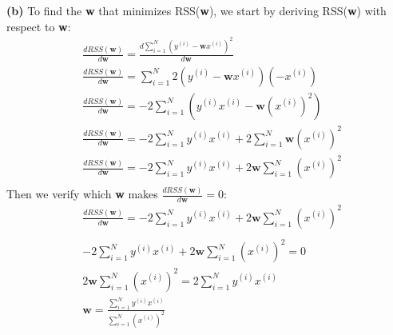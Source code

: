 \documentclass[leqno]{article}
\begin{document}
\hfill

\noindent \textbf{(b)} To find the \textbf{w} that minimizes RSS(\textbf{w}), we start by deriving RSS(\textbf{w}) with respect to \textbf{w}:
\begin{equation*}
\begin{split}
&\frac{dRSS(\textbf{w})}{d\textbf{w}} = \frac{d\sum_{i=1}^{N}(y^{(i)} - \textbf{w}x^{(i)})^2}{d\textbf{w}}\\
&\frac{dRSS(\textbf{w})}{d\textbf{w}} = \sum_{i=1}^{N}2(y^{(i)} - \textbf{w}x^{(i)})(-x^{(i)})\\
&\frac{dRSS(\textbf{w})}{d\textbf{w}} = -2\sum_{i=1}^{N}(y^{(i)}x^{(i)} - \textbf{w}(x^{(i)})^2)\\
&\frac{dRSS(\textbf{w})}{d\textbf{w}} = -2\sum_{i=1}^{N}y^{(i)}x^{(i)} + 2\sum_{i=1}^{N}\textbf{w}(x^{(i)})^2\\
&\frac{dRSS(\textbf{w})}{d\textbf{w}} = -2\sum_{i=1}^{N}y^{(i)}x^{(i)} + 2\textbf{w}\sum_{i=1}^{N}(x^{(i)})^2\\  
\end{split}
\end{equation*}   
Then we verify which \textbf{w} makes $\frac{dRSS(\textbf{w})}{d\textbf{w}} = 0$:
\begin{equation*}
\begin{split}
&\frac{dRSS(\textbf{w})}{d\textbf{w}} = -2\sum_{i=1}^{N}y^{(i)}x^{(i)} + 2\textbf{w}\sum_{i=1}^{N}(x^{(i)})^2\\\\
&-2\sum_{i=1}^{N}y^{(i)}x^{(i)} + 2\textbf{w}\sum_{i=1}^{N}(x^{(i)})^2 = 0\\
&2\textbf{w}\sum_{i=1}^{N}(x^{(i)})^2 = 2\sum_{i=1}^{N}y^{(i)}x^{(i)}\\
&\textbf{w} = \frac{\sum_{i=1}^{N}y^{(i)}x^{(i)}}{\sum_{i=1}^{N}(x^{(i)})^2}\\  
\end{split}
\end{equation*}   
\end{document}
